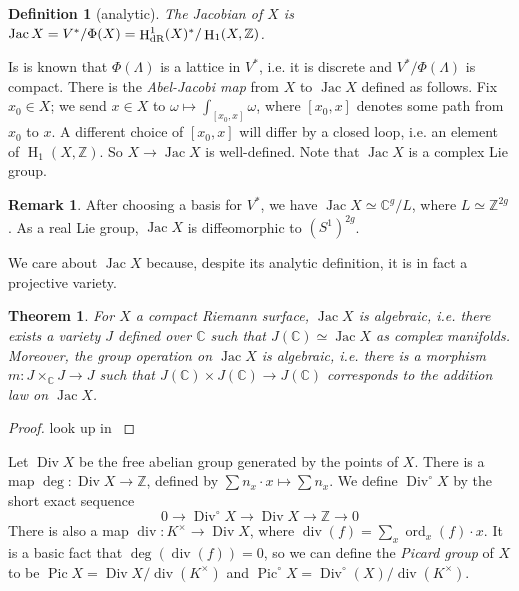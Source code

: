 \documentclass{article}
\DeclareMathOperator{\Div}{Div}
\DeclareMathOperator{\h}{H}
\DeclareMathOperator{\jac}{Jac}
\DeclareMathOperator{\ord}{ord}
\DeclareMathOperator{\pic}{Pic}
\newtheorem{theorem}[subsection]{Theorem}
\newtheorem{definition}[subsection]{Definition}
\theoremstyle{definition}
\newtheorem{remark}[subsection]{Remark}
\begin{document}
\begin{definition}[analytic]
The \emph{Jacobian} of $X$ is 
$\jac X=V^*/\Phi(X) = \h_\textnormal{dR}^1(X)^*/\h_1(X,\mathbb{Z})$. 
\end{definition}

Is is known that $\Phi(\Lambda)$ is a lattice in $V^*$, i.e. it is discrete 
and $V^*/\Phi(\Lambda)$ is compact. There is the \emph{Abel-Jacobi map} from 
$X$ to $\jac X$ defined as follows. Fix $x_0\in X$; we send $x\in X$ to 
$\omega\mapsto \int_{[x_0,x]} \omega$, where $[x_0,x]$ denotes some path from 
$x_0$ to $x$. A different choice of $[x_0,x]$ will differ by a closed loop, 
i.e. an element of $\h_1(X,\mathbb{Z})$. So $X\to\jac X$ is well-defined. Note 
that $\jac X$ is a complex Lie group. 

\begin{remark}
After choosing a basis for $V^*$, we have $\jac X\simeq \mathbb{C}^g/L$, where 
$L\simeq \mathbb{Z}^{2 g}$. As a real Lie group, $\jac X$ is diffeomorphic to 
$(S^1)^{2 g}$. 
\end{remark}

We care about $\jac X$ because, despite its analytic definition, it is in fact 
a projective variety.

\begin{theorem}
For $X$ a compact Riemann surface, $\jac X$ is algebraic, i.e. there exists a 
variety $J$ defined over $\mathbb{C}$ such that $J(\mathbb{C})\simeq\jac X$ as 
complex manifolds. Moreover, the group operation on $\jac X$ is algebraic, 
i.e. there is a morphism $m:J\times_\mathbb{C} J\to J$ such that 
$J(\mathbb{C})\times J(\mathbb{C})\to J(\mathbb{C})$ corresponds to the 
addition law on $\jac X$. 
\end{theorem}
\begin{proof}
look up in \cite{mu08}
\end{proof}

Let $\Div X$ be the free abelian group generated by the points of $X$. There 
is a map $\deg:\Div X\to \mathbb{Z}$, defined by 
$\sum n_x\cdot x\mapsto \sum n_x$. We define $\Div^\circ X$ by the short exact 
sequence 
\[
  0 \to \Div^\circ X \to \Div X \to \mathbb{Z} \to 0
\]
There is also a map $\operatorname{div}:K^\times\to \Div X$, where 
$\operatorname{div}(f) = \sum_x \ord_x(f)\cdot x$. It is a basic fact that 
$\deg(\operatorname{div}(f)) = 0$, so we can define the \emph{Picard group} 
of $X$ to be $\pic X = \Div X/\operatorname{div}(K^\times)$ and 
$\pic^\circ X = \Div^\circ (X)/\operatorname{div}(K^\times)$. 
\end{document}
